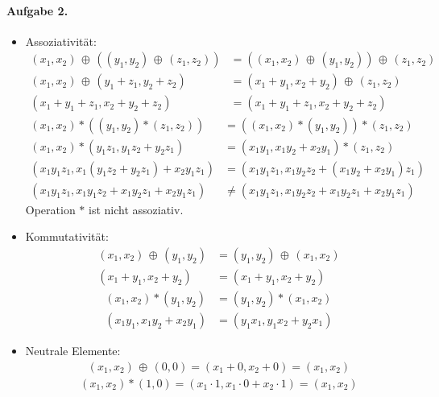 \documentclass{article}
\newcommand{\xor}{\, \oplus\, }
\begin{document}
\paragraph{Aufgabe 2.}

\begin{itemize}
    \item Assoziativität:
    \begin{align*}
        (x_1, x_2) \xor ((y_1, y_2) \xor (z_1, z_2)) &= ((x_1, x_2) \xor (y_1, y_2)) \xor (z_1, z_2) \\
        (x_1, x_2) \xor (y_1 + z_1, y_2 + z_2) &= (x_1 + y_1, x_2 + y_2) \xor (z_1, z_2) \\
        (x_1 + y_1 + z_1, x_2 + y_2 + z_2) &= (x_1 + y_1 + z_1, x_2 + y_2 + z_2)
    \end{align*}
    \begin{align*}
        (x_1, x_2) * ((y_1, y_2) * (z_1, z_2)) &= ((x_1, x_2) * (y_1, y_2)) * (z_1, z_2) \\
        (x_1, x_2) * (y_1z_1, y_1z_2 + y_2z_1) &= (x_1y_1, x_1y_2 + x_2y_1) * (z_1, z_2) \\
        (x_1y_1z_1, x_1(y_1z_2 + y_2z_1) + x_2y_1z_1) &= (x_1y_1z_1, x_1y_2z_2 + (x_1y_2 + x_2y_1)z_1) \\
        (x_1y_1z_1, x_1y_1z_2 + x_1y_2z_1 + x_2y_1z_1) &\neq (x_1y_1z_1, x_1y_2z_2 + x_1y_2z_1 + x_2y_1z_1)
    \end{align*}
    Operation $*$ ist nicht assoziativ.

    \item Kommutativität:
    \begin{align*}
        (x_1, x_2) \xor (y_1, y_2) &= (y_1, y_2) \xor (x_1, x_2) \\
        (x_1 + y_1, x_2 + y_2) &= (x_1 + y_1, x_2 + y_2)
    \end{align*}
    \begin{align*}
        (x_1, x_2) * (y_1, y_2) &= (y_1, y_2) * (x_1, x_2) \\
        (x_1y_1, x_1y_2 + x_2y_1) &= (y_1x_1, y_1x_2 + y_2x_1)
    \end{align*}

    \item Neutrale Elemente:
    \begin{align*}
        (x_1, x_2) \xor (0, 0) = (x_1 + 0, x_2 + 0) = (x_1, x_2)
    \end{align*}
    \begin{align*}
        (x_1, x_2) * (1, 0) = (x_1 \cdot 1, x_1 \cdot 0 + x_2 \cdot 1) = (x_1, x_2)
    \end{align*}


\end{itemize}
\end{document}
